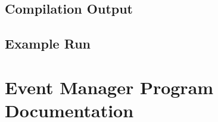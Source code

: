 \documentclass{article}
\begin{document}












\subsection{Compilation Output}

\subsection{Example Run}

\section{Event Manager Program Documentation}
\end{document}
